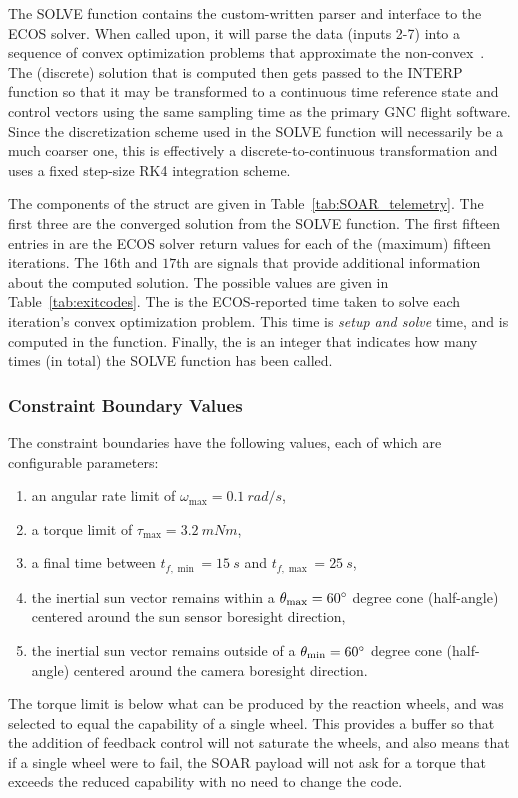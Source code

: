 \documentclass[10pt]{article}
\begin{document}
The SOLVE function contains the custom-written parser and interface to the ECOS solver. When called upon, it will parse the data (inputs 2-7) into a sequence of convex optimization problems that approximate the non-convex~. The (discrete) solution that is computed then gets passed to the INTERP function so that it may be transformed to a continuous time reference state and control vectors using the same sampling time as the primary GNC flight software. Since the discretization scheme used in the SOLVE function will necessarily be a much coarser one, this is effectively a discrete-to-continuous transformation and uses a fixed step-size RK4 integration scheme. 

The components of the  struct are given in Table~\ref{tab:SOAR_telemetry}. The first three are the converged solution from the SOLVE function. The first fifteen entries in  are the ECOS solver return values for each of the (maximum) fifteen iterations. The $16$th and $17$th are signals that provide additional information about the computed solution. The possible values are given in Table~\ref{tab:exitcodes}. The  is the ECOS-reported time taken to solve each iteration's convex optimization problem. This time is \textit{setup and solve} time, and is computed in the  function. Finally, the  is an integer that indicates how many times (in total) the SOLVE function has been called.

\subsubsection{Constraint Boundary Values}

The constraint boundaries have the following values, each of which are configurable parameters:
\begin{enumerate}
\item an angular rate limit of $\omega_{\max} = 0.1~\unit{rad/s}$,
\item a torque limit of $\tau_{\max} = 3.2~\unit{mNm}$,
\item a final time between $t_{f,\min}=15~\unit{s}$ and $t_{f,\max}=25~\unit{s}$,
\item the inertial sun vector remains within a $\theta_{\max}=60\mathrm{^{\circ}}$ degree cone (half-angle) centered around the sun sensor boresight direction,
\item the inertial sun vector remains outside of a $\theta_{\min}=60\mathrm{^{\circ}}$ degree cone (half-angle) centered around the camera boresight direction. 
\end{enumerate} 
The torque limit is below what can be produced by the reaction wheels, and was selected to equal the capability of a single wheel. This provides a buffer so that the addition of feedback control will not saturate the wheels, and also means that if a single wheel were to fail, the SOAR payload will not ask for a torque that exceeds the reduced capability with no need to change the code.
\end{document}
